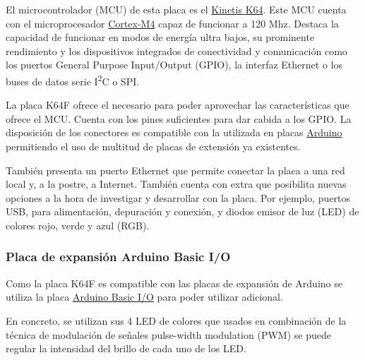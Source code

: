 
El microcontrolador (MCU) de esta placa es el \href{https://www.nxp.com/products/processors-and-microcontrollers/arm-based-processors-and-mcus/kinetis-cortex-m-mcus/k-seriesperformancem4/k6x-ethernet/kinetis-k64-120-mhz-256kb-sram-microcontrollers-mcus-based-on-arm-cortex-m4-core:K64_120}
{Kinetis K64}. Este MCU cuenta con el microprocesador \href{https://developer.arm.com/products/processors/cortex-m/cortex-m4}
{Cortex-M4} capaz de funcionar a 120 Mhz. Destaca la capacidad de funcionar en 
modos de energía ultra bajos, su prominente rendimiento y los dispositivos
integrados de conectividad y comunicación como los puertos General Purpose
Input/Output (GPIO), la interfaz Ethernet o los buses de datos serie
I\textsuperscript{2}C o SPI.

La placa K64F ofrece el  necesario para poder aprovechar
las características que ofrece el MCU. Cuenta con los pines suficientes para dar 
cabida a los GPIO. La disposición de los conectores es compatible con la
utilizada en placas \href{https://www.arduino.cc/}{Arduino} permitiendo el uso
de multitud de placas de extensión ya existentes.

También presenta un puerto Ethernet que permite conectar la placa a una red
local y, a la postre, a Internet. También cuenta con 
extra que posibilita nuevas opciones a la hora de investigar y desarrollar con
la placa. Por ejemplo, puertos USB, para alimentación, depuración y conexión, y
diodos emisor de luz (LED) de colores rojo, verde y azul (RGB).

\subsubsection{Placa de expansión Arduino Basic I/O}{\label{sec:basic-io}}
Como la placa K64F es compatible con las placas de expansión de Arduino se
utiliza la placa \href{https://web.archive.org/web/20160818213905/http://www.msebilbao.com/tienda/product_info.php?cPath=130&products_id=793&osCsid=f967e6ddeaaa2f19050972ff62295a08}
{Arduino Basic I/O} para poder utilizar  adicional.


En concreto, se utilizan sus 4 LED de colores que usados en combinación de la
técnica de modulación de señales pulse-width modulation (PWM) se puede regular
la intensidad del brillo de cada uno de los LED.

